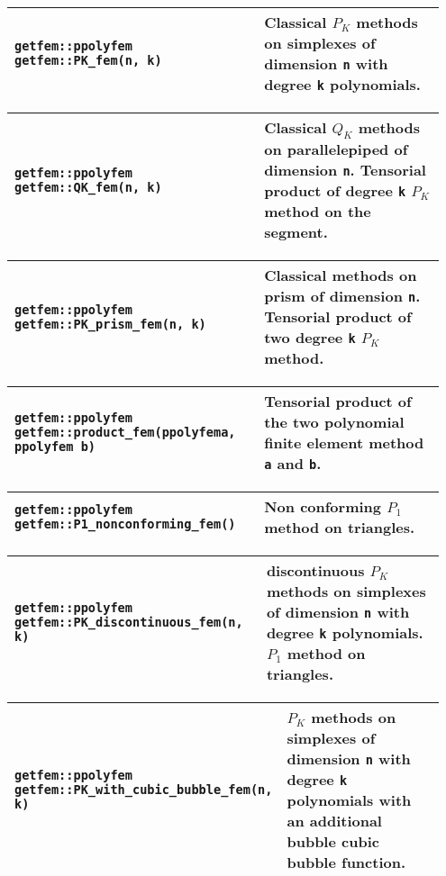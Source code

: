 \begin{center} \begin{tabular}{|m{0.55\linewidth}|m{0.4\linewidth}|} \hline
{\tt getfem::ppolyfem getfem::PK\_fem(n, k)} & Classical $P_K$ methods on simplexes of dimension  {\tt n} with degree {\tt k} polynomials.\\ \hline
\end{tabular}  
\begin{tabular}{|m{0.55\linewidth}|m{0.4\linewidth}|} \hline
{\tt getfem::ppolyfem getfem::QK\_fem(n, k)} & Classical $Q_K$ methods on parallelepiped of dimension {\tt n}. Tensorial product of degree {\tt k} $P_K$ method on the segment. \\ \hline
\end{tabular}  
\begin{tabular}{|m{0.55\linewidth}|m{0.4\linewidth}|} \hline
{\tt getfem::ppolyfem getfem::PK\_prism\_fem(n, k)} & Classical methods on prism of dimension {\tt n}. Tensorial product of two degree {\tt k} $P_K$ method. \\ \hline
\end{tabular}  
\begin{tabular}{|m{0.55\linewidth}|m{0.4\linewidth}|} \hline
{\tt getfem::ppolyfem getfem::product\_fem(ppolyfem\;a, ppolyfem b)} & Tensorial product of the two polynomial finite element method {\tt a} and {\tt b}. \\ \hline
\end{tabular}  
\begin{tabular}{|m{0.55\linewidth}|m{0.4\linewidth}|} \hline
{\tt getfem::ppolyfem getfem::P1\_nonconforming\_fem()} & Non conforming $P_1$ method on triangles. \\ \hline
\end{tabular}  
\begin{tabular}{|m{0.55\linewidth}|m{0.4\linewidth}|} \hline
{\tt getfem::ppolyfem getfem::PK\_discontinuous\_fem(n, k)} & discontinuous $P_K$ methods on simplexes of dimension  {\tt n} with degree {\tt k} polynomials. $P_1$ method on triangles. \\ \hline
\end{tabular}  
\begin{tabular}{|m{0.55\linewidth}|m{0.4\linewidth}|} \hline
{\tt getfem::ppolyfem $\hspace{5em}$ getfem::PK\_with\_cubic\_bubble\_fem(n, k)} & $P_K$ methods on simplexes of dimension  {\tt n} with degree {\tt k} polynomials with an additional bubble cubic bubble function.  \\ \hline
\end{tabular} \end{center}
